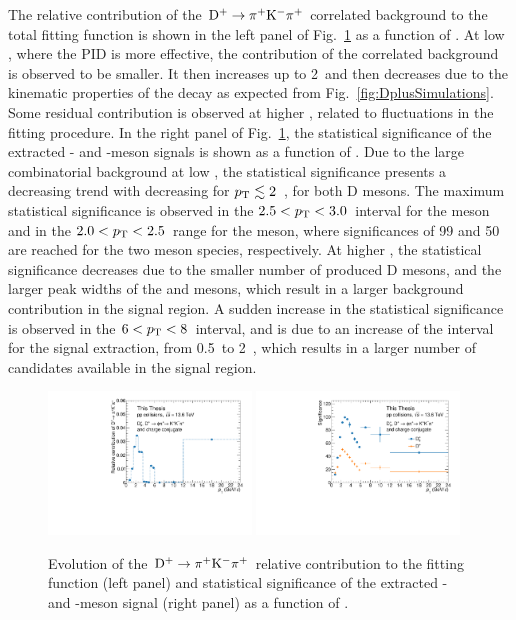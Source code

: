 The relative contribution of the $\mathrm{D^+}\rightarrow\mathrm{\pi^+K^-\pi^+}$ correlated background to the total fitting function is shown in the left panel of Fig.~\ref{fig:frac_signif} as a function of \pt. At low \pt, where the PID is more effective, the contribution of the correlated background is observed to be smaller. It then increases up to 2~\gevc and then decreases due to the kinematic properties of the decay as expected from Fig.~\ref{fig:DplusSimulations}. Some residual contribution is observed at higher \pt, related to fluctuations in the fitting procedure. In the right panel of Fig.~\ref{fig:frac_signif}, the statistical significance of the extracted \ds- and \dpl-meson signals is shown as a function of \pt. Due to the large combinatorial background at low \pt, the statistical significance presents a decreasing trend with decreasing \pt for $p_\mathrm{T}\lesssim2$~\gevc, for both D mesons. The maximum statistical significance is observed in the $2.5<p_\mathrm{T}<3.0$~\gevc interval for the \ds meson and in the $2.0<p_\mathrm{T}<2.5$~\gevc range for the \dpl meson, where significances of 99 and 50 are reached for the two meson species, respectively. At higher \pt, the statistical significance decreases due to the smaller number of produced D mesons, and the larger peak widths of the \ds and \dpl mesons, which result in a larger background contribution in the signal region. A sudden increase in the statistical significance is observed in the $6<p_\mathrm{T}<8$~\gevc interval, and is due to an increase of the \pt interval for the signal extraction, from 0.5~\gevc to 2~\gevc, which results in a larger number of candidates available in the signal region.

\begin{figure}[htb]
    \centering
    \includegraphics[width=0.48\textwidth]{Figures/Chapter 5/Frac.pdf}
    \includegraphics[width=0.48\textwidth]{Figures/Chapter 5/Significance.pdf}
    \caption{Evolution of the $\mathrm{D^+} \rightarrow \mathrm{\pi^+K^-\pi^+}$ relative contribution to the fitting function (left panel) and statistical significance of the extracted \ds- and \dpl-meson signal (right panel) as a function of \pt.}
    \label{fig:frac_signif}
\end{figure}




